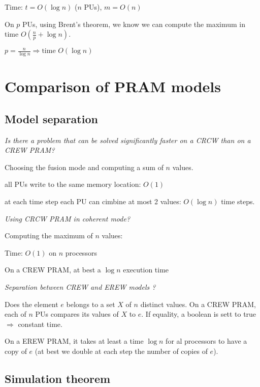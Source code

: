 Time: $t=O(\log n)$ ($n$ PUs), $m=O(n)$

On $p$ PUs, using Brent's theorem, we know we can compute the maximum in time $O\left(\frac{n}{p} + \log n \right)$.

$p=\frac{n}{\log n} \Rightarrow \text{time } O(\log n)$

\section{Comparison of PRAM models}
\subsection{Model separation}
\textit{Is there a problem that can be solved significantly faster on a CRCW than on a CREW PRAM?}


Choosing the fusion mode and computing a sum of $n$ values.

 all PUs write to the same memory location: $O(1)$

 at each time step each PU can cimbine at most 2 values: $O(\log n)$ time steps.

\bigskip
\textit{Using CRCW PRAM in coherent mode?}

Computing the maximum of $n$ values: 


\begin{algorithm}[H]
\end{algorithm}
Time: $O(1)$ on $n$ processors

On a CREW PRAM, at best a $\log n$ execution time



\bigskip\textit{Separation between CREW and EREW models ?}

Does the element $e$ belongs to a set $X$ of $n$ distinct values. On a CREW PRAM, each of $n$ PUs compares its values of $X$ to $e$. If equality, a boolean is sett to true $\Rightarrow$ constant time.

On a EREW PRAM, it takes at least a time $\log n$ for al processors to have a copy of $e$ (at best we double at each step the number of copies of $e$).

\subsection{Simulation theorem}


